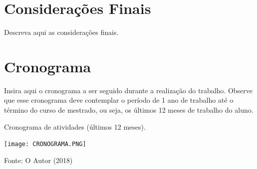 \documentclass[article,11pt,oneside,a4paper,english,brazil,sumario=tradicional]{abntex2}
\begin{document}
\section{Considerações Finais}
Descreva aqui as considerações finais.  

\section{Cronograma}
Insira aqui o cronograma a ser seguido durante a realização do trabalho. Observe que esse cronograma deve contemplar o período de 1 ano de trabalho até o término do curso de mestrado, ou seja, os últimos 12 meses de trabalho do aluno.  

\begin{quadro}[H]
    \label{q:tabela1}
    \centering
    \caption{Cronograma de atividades (últimos 12 meses).}
    \texttt{[image: CRONOGRAMA.PNG]}
        
    Fonte: O Autor (2018)
\end{quadro}

\renewcommand{\bibsection}{\section{REFER\^ENCIAS}}




\end{document}
